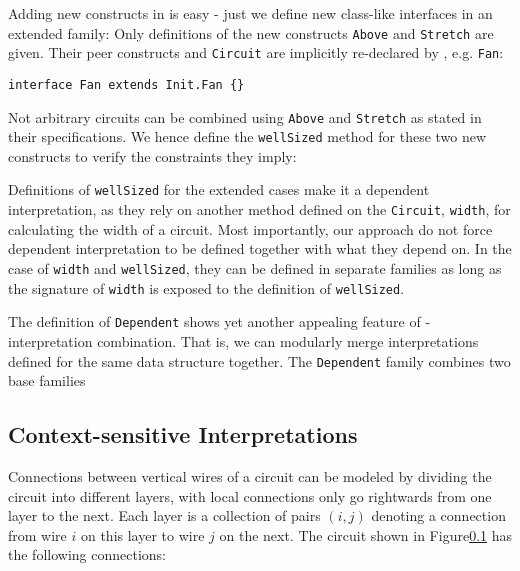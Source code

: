 Adding new constructs in \name is easy - just we define new class-like
interfaces in an extended family:
Only definitions of the new constructs \texttt{Above} and \texttt{Stretch} are given.
Their peer constructs and \texttt{Circuit} are implicitly re-declared by \name,
e.g. \texttt{Fan}:

\begin{lstlisting}
interface Fan extends Init.Fan {}
\end{lstlisting}

Not arbitrary circuits can be combined using \texttt{Above} and \texttt{Stretch}
as stated in their specifications.
We hence define the \texttt{wellSized} method for these two new constructs to
verify the constraints they imply:

Definitions of \texttt{wellSized} for the extended cases make it a dependent interpretation, as they
rely on another method defined on the \texttt{Circuit}, \texttt{width}, for calculating the width of a circuit.
Most importantly, our approach do not force dependent interpretation to be
defined together with what they depend on. In the case of \texttt{width} and
\texttt{wellSized}, they can be defined in separate families as long as the
signature of \texttt{width} is exposed to the definition of \texttt{wellSized}.

The definition of \texttt{Dependent} shows yet another appealing feature of \name - interpretation combination.
That is, we can modularly merge interpretations defined for the same data structure together.
The \texttt{Dependent} family combines two base families


\subsection{Context-sensitive Interpretations}
Connections between vertical wires of a circuit can be modeled by dividing the
circuit into different layers, with local connections only go rightwards from
one layer to the next. Each layer is a collection of pairs $(i,j)$ denoting a
connection from wire $i$ on this layer to wire $j$ on the next. The circuit shown in
Figure\ref{} has the following connections:

